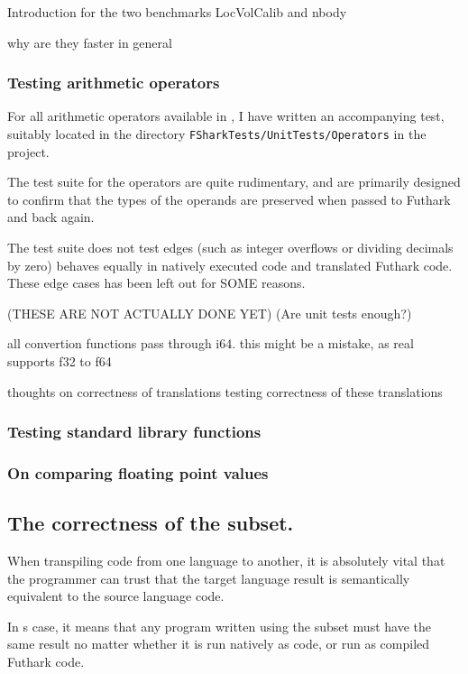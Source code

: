 Introduction for the two benchmarks LocVolCalib and nbody



why are they faster in general



\subsubsection*{Testing arithmetic operators}
For all arithmetic operators available in \fshark{}, I have written an
accompanying test, suitably located in the directory
\texttt{FSharkTests/UnitTests/Operators} in the \fshark{} project.

The test suite for the operators are quite rudimentary, and are primarily
designed to confirm that the types of the operands are preserved when passed to
Futhark \csharp{} and back again.

The test suite does not test edges (such as integer overflows or dividing
decimals by zero) behaves equally in natively executed \fshark{} code and
translated Futhark \csharp{} code.
These edge cases has been left out for SOME reasons.

(THESE ARE NOT ACTUALLY DONE YET)
(Are unit tests enough?)

all convertion functions pass through i64. this might be a mistake, as real
supports f32 to f64

thoughts on correctness of translations
testing correctness of these translations

\subsubsection*{Testing \fsharp{} standard library functions}

\subsubsection*{On comparing floating point values}


\clearpage
\subsection*{The correctness of the \fshark{} subset.}
When transpiling code from one language to another, it is absolutely vital that
the programmer can trust that the target language result
is semantically equivalent to the source language code.

In \fshark{}s case, it means that any program written using the \fshark{}
subset must have the same result no matter whether it is run natively as
\fsharp{} code, or run as \fshark{} compiled Futhark code.

